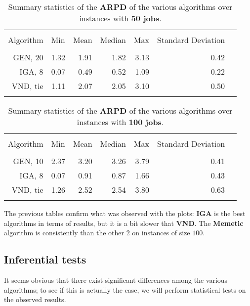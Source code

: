 \documentclass[
12pt,
a4paper,
oneside,
headinclude,
footinclude]{article}
\theoremstyle{definition} %
\begin{document}
\begin{table}[H]
    \centering
    \begin{tabular}{rlrrrrr}
        \hline
        \\[-1.5ex]
        Algorithm & Min & Mean & Median & Max & Standard Deviation \\ 
        \hline
        \\[-1.5ex]        
        GEN, 20 & 1.32 & 1.91 & 1.82 & 3.13 & 0.42 \\ 
        IGA, 8 & 0.07 & 0.49 & 0.52 & 1.09 & 0.22 \\ 
        VND, tie & 1.11 & 2.07 & 2.05 & 3.10 & 0.50 \\ 
        \\[-1.6ex]
        \hline
    \end{tabular}
    \caption{\label{tab:50-arpd}Summary statistics of the \textbf{ARPD} of the various algorithms over instances with \textbf{50 jobs}.}
\end{table}

\begin{table}[H]
    \centering
    \begin{tabular}{rlrrrrr}
        \hline
        \\[-1.5ex]
        Algorithm & Min & Mean & Median & Max & Standard Deviation \\ 
        \hline
        \\[-1.5ex]
        GEN, 10 & 2.37 & 3.20 & 3.26 & 3.79 & 0.41 \\ 
        IGA, 8 & 0.07 & 0.91 & 0.87 & 1.66 & 0.43 \\ 
        VND, tie & 1.26 & 2.52 & 2.54 & 3.80 & 0.63 \\ 
        \\[-1.6ex]
        \hline
    \end{tabular}
    \caption{\label{tab:100-arpd}Summary statistics of the \textbf{ARPD} of the various algorithms over instances with \textbf{100 jobs}.}
\end{table}   
   
    
The previous tables confirm what was observed with the plots: \textbf{IGA} is the best algorithms in terms of results, but it is a bit slower that \textbf{VND}. The \textbf{Memetic} algorithm is consistently than the other 2 on instances of size $100$.

\subsection{Inferential tests}
It seems obvious that there exist significant differences among the various algorithms; to see if this is actually the case, we will perform statistical tests on the observed results.
\end{document}
